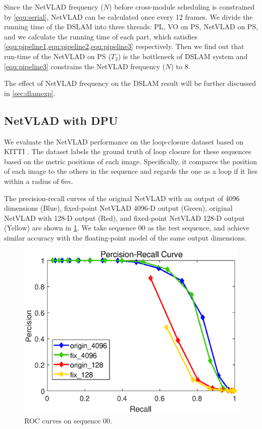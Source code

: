 Since the NetVLAD frequency ($N$) before cross-module scheduling is constrained by \cref{equ:serial}, NetVLAD can be calculated once every 12 frames. We divide the running time of the DSLAM into three threads: PL, VO on PS, NetVLAD on PS, and we calculate the running time of each part, which satisfies \cref{equ:pipeline1,equ:pipeline2,equ:pipeline3} respectively. Then we find out that run-time of the NetVLAD on PS ($T_{3}$) is the bottleneck of DSLAM system and \cref{equ:pipeline3} constrains the NetVLAD frequency ($N$) to $8$.


The effect of NetVLAD frequency on the DSLAM result will be further discussed in \cref{sec:dlamexp}.  

\subsection{NetVLAD with DPU}

We evaluate the NetVLAD performance on the loop-closure dataset based on KITTI \cite{KITTIGroundTruth}.
The dataset labels the ground truth of loop closure for these sequences based on the metric positions of each image. Specifically, it compares the position of each image to the others in the sequence and regards the one as a loop if it lies within a radius of $6m$.

The precision-recall curves of the original NetVLAD with an output of 4096 dimensions (Blue), fixed-point NetVLAD 4096-D output (Green), original NetVLAD with 128-D output (Red), and fixed-point NetVLAD 128-D output (Yellow) are shown in \cref{fig:reloc}. We take sequence 00 as the test sequence, and achieve similar accuracy with the floating-point model of the same output dimensions.


\begin{figure}[thb]
  \centering  
  \includegraphics[width=0.95\linewidth]{fig/val_reloc.eps}
  \caption{ROC curves on sequence 00.}
  \label{fig:reloc}
\end{figure}

